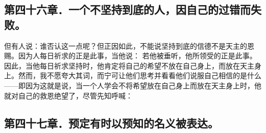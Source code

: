 
\subsection{第四十六章．一个不坚持到底的人，因自己的过错而失败。}

但有人说：谁否认这一点呢？但正因如此，不能说坚持到底的信德不是天主的恩赐。因为人每日祈求的正是此事，当他说：  若他被垂听，他所领受的正是此事。因此，当他每日祈求坚持时，他肯定将自己的希望不放在自己身上，而放在天主身上。然而，我不愿夸大其词，而宁可让他们思考并看看他们说服自己相信的是什么——即因为这就是说，当一个人学会不将希望放在自己身上而放在天主身上时，他就对自己的救恩绝望了，尽管先知呼喊： \par


\subsection{第四十七章．预定有时以预知的名义被表达。}

